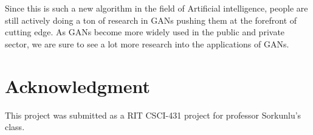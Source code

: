 \documentclass[12pt,
 reprint,
 amsmath,amssymb,
 aps,
]{revtex4-2}
\begin{document}
Since this is such a new algorithm in the field of Artificial intelligence, people are still actively doing a ton of research in GANs pushing them at the forefront of cutting edge. As GANs become more widely used in the public and private sector, we are sure to see a lot more research into the applications of GANs.

\section{Acknowledgment}

This project was submitted as a RIT CSCI-431 project for professor Sorkunlu's class. 





\end{document}
